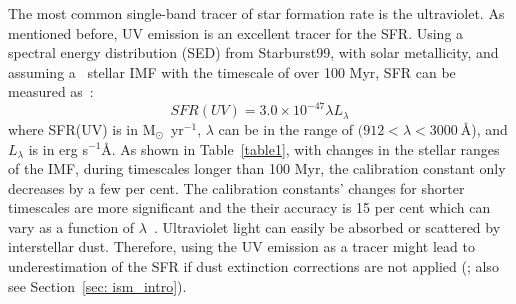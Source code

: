 The most common single-band tracer of star formation rate is the ultraviolet.
As mentioned before, UV emission is an excellent tracer for the SFR.
Using a spectral energy distribution (SED) from Starburst99, with solar metallicity, and assuming a~\cite{Kroupa01} stellar IMF with the timescale of over 100 Myr, SFR can be measured as~\citep{Leitherer99}:
\begin{equation}
SFR(UV) = 3.0 \times 10^{-47}\lambda L_{\lambda}
\end{equation}
where SFR(UV) is in M$_{\odot}$~yr$^{-1}$, $\lambda$ can be in the range of $(912< \lambda < 3000~$\AA), and $L_{\lambda}$ is in erg s$^{-1}$\AA.
As shown in Table~\ref{table1}, with changes in the stellar ranges of the IMF, during timescales longer than 100 Myr, the calibration constant only decreases by a few per cent.
The calibration constants' changes for shorter timescales are more significant and 
the their accuracy is 15 per cent which can vary as a function of $\lambda$~\citep{Calzetti13}.
Ultraviolet light can easily be absorbed or scattered by interstellar dust. 
Therefore, using the UV emission as a tracer might lead to underestimation of the SFR if dust extinction corrections are not applied (\cite{Kennicutt12}; also see Section~\ref{sec: ism_intro}). 

